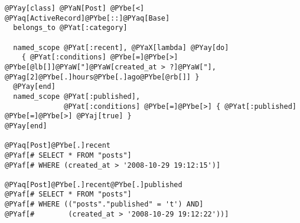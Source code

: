 \begin{Verbatim}[commandchars=@\[\]]
@PYay[class] @PYaN[Post] @PYbe[<] @PYaq[ActiveRecord]@PYbe[::]@PYaq[Base]
  belongs_to @PYat[:category]

  named_scope @PYat[:recent], @PYaX[lambda] @PYay[do]
    { @PYat[:conditions] @PYbe[=]@PYbe[>] @PYbe[@lb[]]@PYaW["]@PYaW[created_at > ?]@PYaW["], @PYag[2]@PYbe[.]hours@PYbe[.]ago@PYbe[@rb[]] }
  @PYay[end]
  named_scope @PYat[:published],
              @PYat[:conditions] @PYbe[=]@PYbe[>] { @PYat[:published] @PYbe[=]@PYbe[>] @PYaj[true] }
@PYay[end]

@PYaq[Post]@PYbe[.]recent
@PYaf[# SELECT * FROM "posts"]
@PYaf[# WHERE (created_at > '2008-10-29 19:12:15')]

@PYaq[Post]@PYbe[.]recent@PYbe[.]published
@PYaf[# SELECT * FROM "posts"]
@PYaf[# WHERE (("posts"."published" = 't') AND]
@PYaf[#        (created_at > '2008-10-29 19:12:22'))]
\end{Verbatim}
